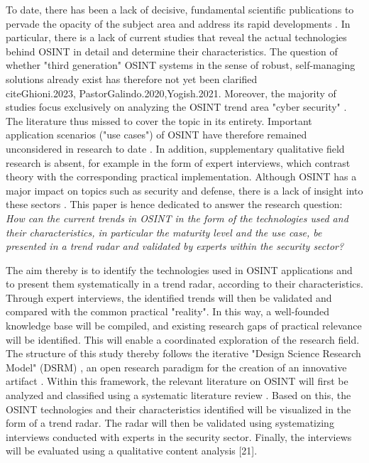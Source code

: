 \documentclass[10pt]{article}
\begin{document}
To date, there has been a lack of decisive, fundamental scientific publications to pervade
the opacity of the subject area \cite{HerreraCubides.2020} and address its rapid
developments \cite{Ghioni.2023, Williams.2018}. In particular, there is a lack of current
studies that reveal the actual technologies behind OSINT in detail and determine their
characteristics. The question of whether "third generation" OSINT systems in the sense of
robust, self-managing solutions \cite{PastorGalindo.2019, PastorGalindo.2020} already exist
has therefore not yet been clarified \\cite{Ghioni.2023, PastorGalindo.2020,Yogish.2021}.
Moreover, the majority of studies focus exclusively on analyzing the OSINT trend area "cyber
security" \cite{Hwang.2022, PastorGalindo.2019, Yogish.2021}. The literature thus missed to
cover the topic in its entirety. Important application scenarios ("use cases") of OSINT have
therefore remained unconsidered in research to date \cite{AlKilani.2021, Dokman.2020, Ghioni.2023}.
In addition, supplementary qualitative field research is absent, for example in the form
of expert interviews, which contrast theory with the corresponding practical implementation.
Although OSINT has a major impact on topics such as security and defense, there is a lack of
insight into these sectors \cite{HerreraCubides.2020, PastorGalindo.2019}. This paper is
hence dedicated to answer the research question:
\textit{How can the current trends in OSINT in the form of the technologies used and their
    characteristics, in particular the maturity level and the use case, be presented in a
    trend radar and validated by experts within the security sector?}

The aim thereby is to identify the technologies used in OSINT applications and to present
them systematically in a trend radar, according to their characteristics. Through expert
interviews, the identified trends will then be validated and compared with the common
practical "reality". In this way, a well-founded knowledge base will be compiled, and
existing research gaps of practical relevance will be identified. This will enable a
coordinated exploration of the research field. The structure of this study thereby follows
the iterative "Design Science Research Model" (DSRM) \cite{Peffers.2007}, an open research
paradigm for the creation of an innovative artifact \cite{vomBrocke.2020b}. Within this
framework, the relevant literature on OSINT will first be analyzed and classified using a
systematic literature review \cite{Webster.2002}. Based on this, the OSINT technologies and
their characteristics identified will be visualized in the form of a trend radar. The radar
will then be validated using systematizing interviews \cite{Bogner.2014} conducted with
experts in the security sector. Finally, the interviews will be evaluated using a
qualitative content analysis [21].
\end{document}
